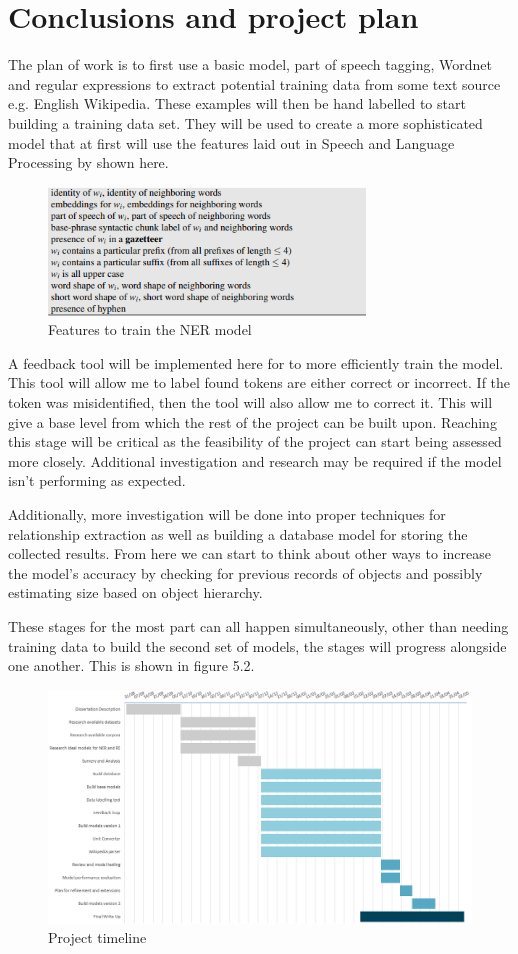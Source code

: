\chapter{Conclusions and project plan}

The plan of work is to first use a basic model, part of speech tagging, Wordnet and regular expressions to extract potential training data from some text source e.g. English Wikipedia. These examples will then be hand labelled to start building a training data set. They will be used to create a more sophisticated model that at first will use the features laid out in Speech and Language Processing by \cite{reference1} shown here.

\begin{figure}[hbt!]
\centering
\includegraphics[width=0.75\textwidth]{figures/features.png}
\caption{Features to train the NER model}
\end{figure}

A feedback tool will be implemented here for to more efficiently train the model. This tool will allow me to label found tokens are either correct or incorrect. If the token was misidentified, then the tool will also allow me to correct it. This will give a base level from which the rest of the project can be built upon. Reaching this stage will be critical as the feasibility of the project can start being assessed more closely. Additional investigation and research may be required if the model isn’t performing as expected.

Additionally, more investigation will be done into proper techniques for relationship extraction as well as building a database model for storing the collected results. From here we can start to think about other ways to increase the model’s accuracy by checking for previous records of objects and possibly estimating size based on object hierarchy.

These stages for the most part can all happen simultaneously, other than needing training data to build the second set of models, the stages will progress alongside one another. This is shown in figure 5.2.

\begin{figure}[hbt!]
\centering
\includegraphics[width=0.75\paperwidth]{figures/gantt.png}
\caption{Project timeline}
\end{figure}